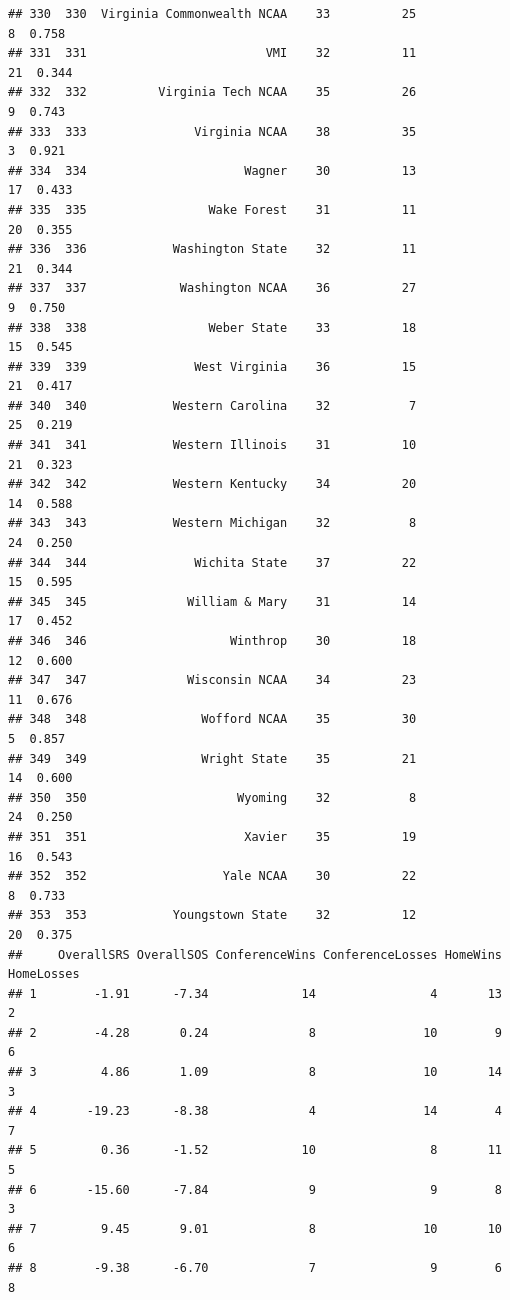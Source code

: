 \documentclass[]{book}
\begin{document}
\begin{verbatim}
## 330  330  Virginia Commonwealth NCAA    33          25             8  0.758
## 331  331                         VMI    32          11            21  0.344
## 332  332          Virginia Tech NCAA    35          26             9  0.743
## 333  333               Virginia NCAA    38          35             3  0.921
## 334  334                      Wagner    30          13            17  0.433
## 335  335                 Wake Forest    31          11            20  0.355
## 336  336            Washington State    32          11            21  0.344
## 337  337             Washington NCAA    36          27             9  0.750
## 338  338                 Weber State    33          18            15  0.545
## 339  339               West Virginia    36          15            21  0.417
## 340  340            Western Carolina    32           7            25  0.219
## 341  341            Western Illinois    31          10            21  0.323
## 342  342            Western Kentucky    34          20            14  0.588
## 343  343            Western Michigan    32           8            24  0.250
## 344  344               Wichita State    37          22            15  0.595
## 345  345              William & Mary    31          14            17  0.452
## 346  346                    Winthrop    30          18            12  0.600
## 347  347              Wisconsin NCAA    34          23            11  0.676
## 348  348                Wofford NCAA    35          30             5  0.857
## 349  349                Wright State    35          21            14  0.600
## 350  350                     Wyoming    32           8            24  0.250
## 351  351                      Xavier    35          19            16  0.543
## 352  352                   Yale NCAA    30          22             8  0.733
## 353  353            Youngstown State    32          12            20  0.375
##     OverallSRS OverallSOS ConferenceWins ConferenceLosses HomeWins HomeLosses
## 1        -1.91      -7.34             14                4       13          2
## 2        -4.28       0.24              8               10        9          6
## 3         4.86       1.09              8               10       14          3
## 4       -19.23      -8.38              4               14        4          7
## 5         0.36      -1.52             10                8       11          5
## 6       -15.60      -7.84              9                9        8          3
## 7         9.45       9.01              8               10       10          6
## 8        -9.38      -6.70              7                9        6          8

\end{verbatim}
\end{document}
